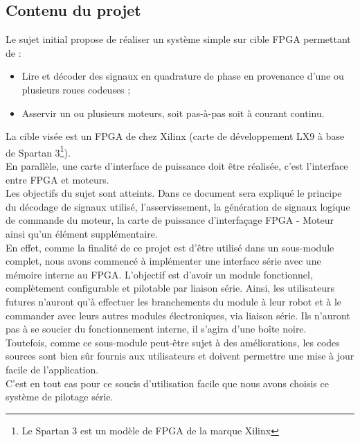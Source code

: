 \newpage
\subsection{Contenu du projet}
Le sujet initial propose de réaliser un système simple sur cible FPGA permettant de :
\begin{itemize}
\item Lire et décoder des signaux en quadrature de phase en provenance d'une ou plusieurs roues codeuses ;
\item Asservir un ou plusieurs moteurs, soit pas-à-pas soit à courant continu.
\end{itemize}

La cible visée est un FPGA de chez Xilinx (carte de développement LX9 à base de Spartan 3\footnote{Le Spartan 3 est un modèle de FPGA de la marque Xilinx}).\\
En parallèle, une carte d'interface de puissance doit \^etre réalisée, c'est l'interface entre FPGA et moteurs.\\

Les objectifs du sujet sont atteints. Dans ce document sera expliqué le principe du décodage de signaux utilisé, l'asservissement, la génération de signaux logique de commande du moteur, la carte de puissance d'interfaçage FPGA - Moteur ainsi qu'un élément supplémentaire.\\
En effet, comme la finalité de ce projet est d'être utilisé dans un sous-module complet, nous avons commencé à implémenter une interface série avec une mémoire interne au FPGA. L'objectif est d'avoir un module fonctionnel, complètement configurable et pilotable par liaison série. Ainsi, les utilisateurs futures n'auront qu'à effectuer les branchements du module à leur robot et à le commander avec leurs autres modules électroniques, via liaison série. Ils n'auront pas à se soucier du fonctionnement interne, il s'agira d'une boîte noire.\\

Toutefois, comme ce sous-module peut-être sujet à des améliorations, les codes sources sont bien sûr fournis aux utilisateurs et doivent permettre une mise à jour facile de l'application.\\
C'est en tout cas pour ce soucis d'utilisation facile que nous avons choisis ce système de pilotage série.\\